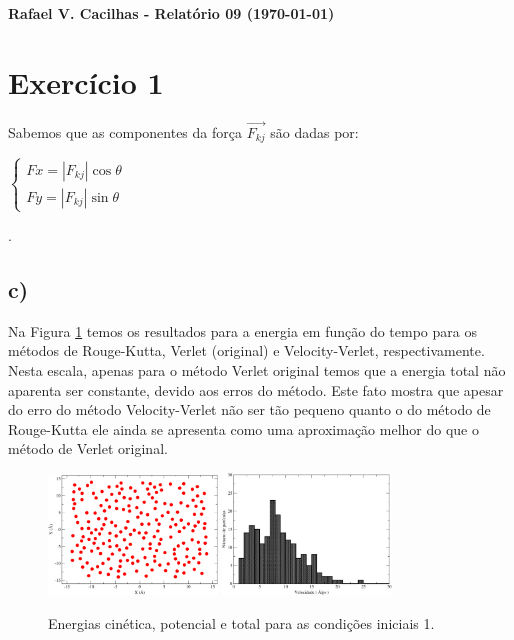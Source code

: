 \documentclass[a4wide]{report}
\begin{document}
\noindent
{\bf Rafael V. Cacilhas  - Relatório 09 (\today)}

\vspace{0.5cm}

\section*{Exercício 1}



Sabemos  que as componentes da força $\vec{F_{kj}}$ são dadas por:

$\begin{cases} 
Fx = |F_{kj}|\cos\theta \\ 
Fy = |F_{kj}|\sin\theta
\end{cases} $

.

\subsection*{c) }

Na Figura \ref{2b1} temos os resultados para a energia em função do tempo para os métodos de Rouge-Kutta, Verlet (original) e Velocity-Verlet, respectivamente. Nesta escala, apenas para o método Verlet original temos que a energia total não aparenta ser constante, devido aos erros do método. Este fato mostra que apesar do erro do método Velocity-Verlet não ser tão pequeno quanto o do método de Rouge-Kutta ele ainda se apresenta como uma aproximação melhor do que o método de Verlet original.

\begin{figure}[!htb]
\centering
\includegraphics[width=0.4\textwidth]{mapa.pdf}
\includegraphics[width=0.4\textwidth]{hist.pdf}
\caption{Energias cinética, potencial e total para as condições iniciais 1.}
\label{2b1}
\end{figure}
\end{document}
